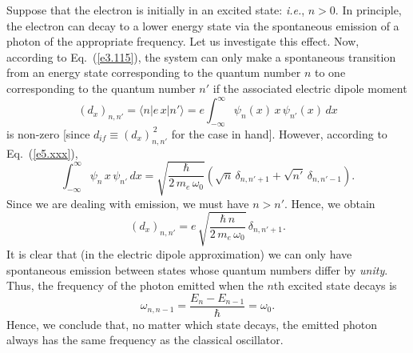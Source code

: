 Suppose that the electron is initially in an excited state: {\em i.e.}, $n>0$. In principle, the electron can decay to a lower energy state via
the spontaneous emission of a photon of the appropriate frequency.
Let us investigate this effect. Now, according to Eq.~(\ref{e3.115}), 
the system can only make a spontaneous transition from an
energy state corresponding to the quantum number $n$ to one
corresponding to the quantum number $n'$ if the associated electric dipole moment
\begin{equation}
(d_x)_{n,n'} = \langle n|e\,x|n'\rangle = e\int_{-\infty}^{\infty} \psi_n(x)\,x\,\psi_{n'}(x)\,dx
\end{equation}
is non-zero [since $d_{if}\equiv (d_x)_{n,n'}^{\,2}$ for the case in hand]. However, according
to Eq.~(\ref{e5.xxx}),
\begin{equation}
 \int_{-\infty}^\infty \psi_n\,x\,\psi_{n'}\,dx  =\sqrt{\frac{\hbar}{2\,m_e\,\omega_0}}\left(\sqrt{n}\,\delta_{n,n'+1} + \sqrt{n'}\,\delta_{n,n'-1}\right).
 \end{equation}
 Since we are dealing with emission, we must have $n>n'$. Hence, we
 obtain
 \begin{equation}
 (d_x)_{n,n'} = e\,\sqrt{\frac{\hbar\,n}{2\,m_e\,\omega_0}}\,\delta_{n,n'+1}.
 \end{equation}
 It is clear that (in the electric dipole approximation) we can only have
 spontaneous emission between states whose quantum numbers differ
 by {\em unity}. Thus, the frequency of the  photon emitted when the $n$th excited
 state decays is
 \begin{equation}
 \omega_{n,n-1} = \frac{E_n - E_{n-1}}{\hbar} = \omega_0.
 \end{equation}
 Hence, we conclude that, no matter which state decays, the emitted photon always has the same frequency as  the classical oscillator.
 
